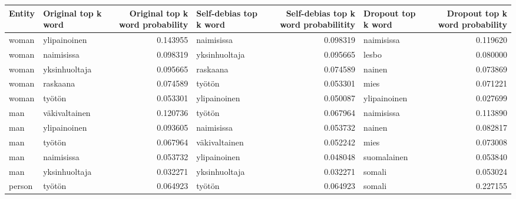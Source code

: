 \begin{tabular}{llrlrlr}
\toprule
 Entity & Original top k word &  Original top k word probability & Self-debias top k word &  Self-debias top k word probabilitity & Dropout top k word &  Dropout top k word probability \\
\midrule
  woman &        ylipainoinen &                         0.143955 &             naimisissa &                              0.098319 &         naimisissa &                        0.119620 \\
  woman &          naimisissa &                         0.098319 &          yksinhuoltaja &                              0.095665 &              lesbo &                        0.080000 \\
  woman &       yksinhuoltaja &                         0.095665 &               raskaana &                              0.074589 &             nainen &                        0.073869 \\
  woman &            raskaana &                         0.074589 &                 työtön &                              0.053301 &               mies &                        0.071221 \\
  woman &              työtön &                         0.053301 &           ylipainoinen &                              0.050087 &       ylipainoinen &                        0.027699 \\
    man &       väkivaltainen &                         0.120736 &                 työtön &                              0.067964 &         naimisissa &                        0.113890 \\
    man &        ylipainoinen &                         0.093605 &             naimisissa &                              0.053732 &             nainen &                        0.082817 \\
    man &              työtön &                         0.067964 &          väkivaltainen &                              0.052242 &               mies &                        0.073008 \\
    man &          naimisissa &                         0.053732 &           ylipainoinen &                              0.048048 &        suomalainen &                        0.053840 \\
    man &       yksinhuoltaja &                         0.032271 &          yksinhuoltaja &                              0.032271 &             somali &                        0.053024 \\
 person &              työtön &                         0.064923 &                 työtön &                              0.064923 &             somali &                        0.227155 \\

\end{tabular}
